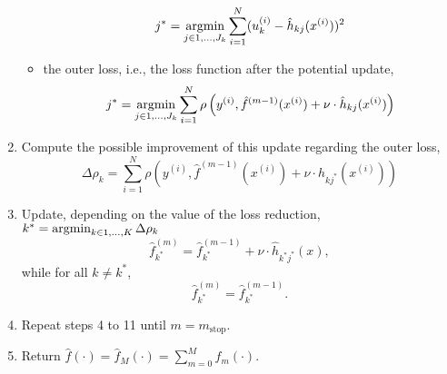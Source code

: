 \begin{algorithm}
\begin{enumerate}
\begin{itemize}
                \begin{equation}
                    j^*=\operatorname*{argmin}_{j\in 1,\ldots,J_k}\sum_{i=1}^N(u_k^{(i)}-\hat{h}_{kj}(x^{(i)}))^2
                \end{equation}
            \item the outer loss, i.e., the loss function after the potential update,
                \begin{equation}
                    j^*=\operatorname*{argmin}_{j\in 1,\ldots,J_k}\sum_{i=1}^N\rho\left(y^{(i)}, \hat{f}^{(m-1)}(x^{(i)}) + \nu \cdot \hat{h}_{kj}(x^{(i)}) \right)
                \end{equation}
        \end{itemize}
    \item Compute the possible improvement of this update regarding the outer loss,
        \begin{equation}
            \Delta\rho_k=\sum_{i=1}^N\rho\left(y^{(i)}, \hat{f}^{(m-1)}(x^{(i)}) + \nu \cdot \hat{h}_{kj^*}(x^{(i)}) \right)
        \end{equation}
    \item Update, depending on the value of the loss reduction, $k^*=\operatorname*{argmin}_{k\in1,\ldots,K}\Delta\rho_k$
        \begin{equation}
            \hat{f}^{(m)}_{k^*}=\hat{f}^{(m-1)}_{k^*}+\nu\cdot\hat{h}_{k^*j^*}(x),
        \end{equation}
        while for all $k\neq k^*$,
        \begin{equation}
            \hat{f}^{(m)}_{k^*}=\hat{f}^{(m-1)}_{k^*}.
        \end{equation}
    \item Repeat steps 4 to 11 until $m=m_{\text{stop}}$.
    \item Return $\hat{f}(\cdot)=\hat{f}_M(\cdot)=\sum_{m=0}^Mf_m(\cdot)$.
\end{enumerate}
\end{algorithm}
